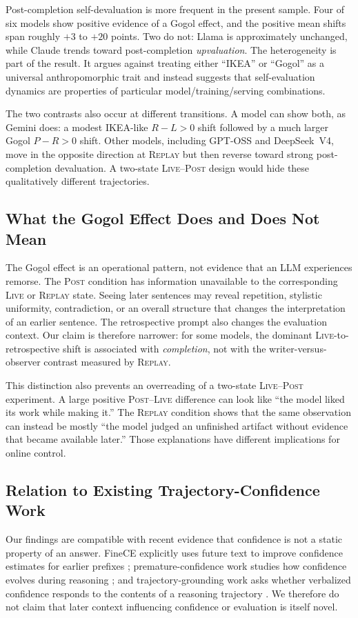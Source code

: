 \documentclass[10pt]{article}
\newcommand{\live}{\textsc{Live}}
\newcommand{\replay}{\textsc{Replay}}
\newcommand{\post}{\textsc{Post}}
\newcommand{\papersubsection}[1]{\Needspace{3.8\baselineskip}\subsection{#1}}
\begin{document}
Post-completion self-devaluation is more frequent in the present sample. Four of six models show positive evidence of a Gogol effect, and the positive mean shifts span roughly $+3$ to $+20$ points. Two do not: Llama is approximately unchanged, while Claude trends toward post-completion \emph{upvaluation}. The heterogeneity is part of the result. It argues against treating either ``IKEA'' or ``Gogol'' as a universal anthropomorphic trait and instead suggests that self-evaluation dynamics are properties of particular model/training/serving combinations.

The two contrasts also occur at different transitions. A model can show both, as Gemini does: a modest IKEA-like $R-L>0$ shift followed by a much larger Gogol $P-R>0$ shift. Other models, including GPT-OSS and DeepSeek~V4, move in the opposite direction at \replay{} but then reverse toward strong post-completion devaluation. A two-state \live{}--\post{} design would hide these qualitatively different trajectories.

\papersubsection{What the Gogol Effect Does and Does Not Mean}
The Gogol effect is an operational pattern, not evidence that an LLM experiences remorse. The \post{} condition has information unavailable to the corresponding \live{} or \replay{} state. Seeing later sentences may reveal repetition, stylistic uniformity, contradiction, or an overall structure that changes the interpretation of an earlier sentence. The retrospective prompt also changes the evaluation context. Our claim is therefore narrower: for some models, the dominant \live{}-to-retrospective shift is associated with \emph{completion}, not with the writer-versus-observer contrast measured by \replay{}.

This distinction also prevents an overreading of a two-state \live{}--\post{} experiment. A large positive \post{}--\live{} difference can look like ``the model liked its work while making it.'' The \replay{} condition shows that the same observation can instead be mostly ``the model judged an unfinished artifact without evidence that became available later.'' Those explanations have different implications for online control.

\papersubsection{Relation to Existing Trajectory-Confidence Work}
Our findings are compatible with recent evidence that confidence is not a static property of an answer. FineCE explicitly uses future text to improve confidence estimates for earlier prefixes \citep{han2025finece}; premature-confidence work studies how confidence evolves during reasoning \citep{gai2026premature}; and trajectory-grounding work asks whether verbalized confidence responds to the contents of a reasoning trajectory \citep{yang2026mirage}. We therefore do not claim that later context influencing confidence or evaluation is itself novel.
\end{document}
